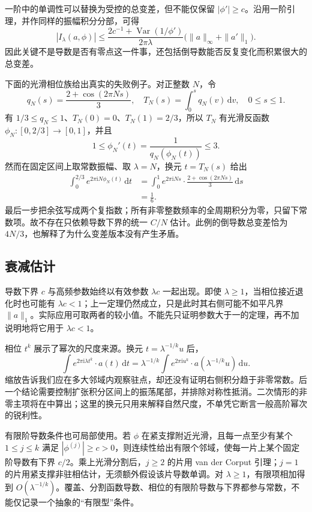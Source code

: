 一阶中的单调性可以替换为受控的总变差，但不能仅保留 \(|\phi'|\geq c\)。沿用一阶引理，并作同样的振幅积分分部，可得
\[
 |I_\lambda(a,\phi)|
 \leq \frac{2c^{-1}+\operatorname{Var}(1/\phi')}{2\pi\lambda}
       \bigl(\|a\|_\infty+\|a'\|_1\bigr).
\]
因此关键不是导数是否有零点这一件事，还包括倒导数能否反复变化而积累很大的总变差。

\ProseParagraphBreak

下面的光滑相位族给出真实的失败例子。对正整数 \(N\)，令
\[
 q_N(s)=\frac{2+\cos(2\pi Ns)}3,
 \quad
 T_N(s)=\int_0^s q_N(v)\,\mathrm dv,
 \quad 0\leq s\leq1.
\]
有 \(1/3\leq q_N\leq1\)、\(T_N(0)=0\)、\(T_N(1)=2/3\)，所以 \(T_N\) 有光滑反函数
\(\phi_N:[0,2/3]\to[0,1]\)，并且
\[
 1\leq\phi_N'(t)
 =\frac1{q_N(\phi_N(t))}\leq3.
\]
然而在固定区间上取常数振幅、取 \(\lambda=N\)，换元 \(t=T_N(s)\) 给出
\[
 \begin{aligned}
 \int_0^{2/3}e^{2\pi\mathrm iN\phi_N(t)}\,\mathrm dt
 &=\int_0^1e^{2\pi\mathrm iNs}\cdot
                  \frac{2+\cos(2\pi Ns)}3\,\mathrm ds\\
 &=\frac16.
 \end{aligned}
\]
最后一步把余弦写成两个复指数；所有非零整数频率的全周期积分为零，只留下常数项。故不存在只依赖导数下界的统一 \(C/N\) 估计。此例的倒导数总变差恰为 \(4N/3\)，也解释了为什么变差版本没有产生矛盾。

\subsection{衰减估计}
\label{b2:subsec:210104}

导数下界 \(c\) 与高频参数始终以有效参数 \(\lambda c\) 一起出现。即使 \(\lambda\geq1\)，当相位接近退化时也可能有 \(\lambda c<1\)；上一定理仍然成立，只是此时其右侧可能不如平凡界 \(\|a\|_1\)。实际应用可取两者的较小值。不能先只证明参数大于一的定理，再不加说明地将它用于 \(\lambda c<1\)。

\ProseParagraphBreak

相位 \(t^k\) 展示了幂次的尺度来源。换元 \(t=\lambda^{-1/k}u\) 后，
\[
 \int e^{2\pi\mathrm i\lambda t^k}\cdot a(t)\,\mathrm dt
 =\lambda^{-1/k}
   \int e^{2\pi\mathrm i u^k}\cdot a(\lambda^{-1/k}u)\,\mathrm du.
\]
缩放告诉我们应在多大邻域内观察驻点，却还没有证明右侧积分趋于非零常数。后一个结论需要控制扩张积分区间上的振荡尾部，并排除对称性抵消。二次情形的非零主项将在中算出；这里的换元只用来解释自然尺度，不单凭它断言一般高阶幂次的锐利性。

\ProseParagraphBreak

有限阶导数条件也可局部使用。若 \(\phi\) 在紧支撑附近光滑，且每一点至少有某个 \(1\leq j\leq k\) 满足 \(|\phi^{(j)}|\geq c>0\)，则连续性给出有限个邻域，使每一片上某个固定阶导数有下界 \(c/2\)。乘上光滑分割后，\(j\geq2\) 的片用 van der Corput 引理；\(j=1\) 的片用紧支撑非驻相估计，无须额外假设该片导数单调。对 \(\lambda\geq1\)，有限项相加得到 \(O(\lambda^{-1/k})\)。覆盖、分割函数导数、相位的有限阶导数与下界都参与常数，不能仅记录一个抽象的“有限型”条件。

